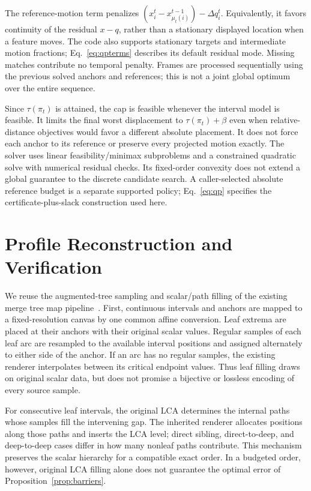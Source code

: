\documentclass[10pt]{article}
\begin{document}
The reference-motion term penalizes
$(x_i^t-x_{\mu_t(i)}^{t-1})-\Delta q_i^t$.
Equivalently, it favors continuity of the residual $x-q$, rather than a stationary displayed location when a feature moves. The code also supports stationary targets and intermediate motion fractions; Eq.~\ref{eq:qpterms} describes its default residual mode. Missing matches contribute no temporal penalty. Frames are processed sequentially using the previous solved anchors and references; this is not a joint global optimum over the entire sequence.

Since $\tau(\pi_t)$ is attained, the cap is feasible whenever the interval model is feasible. It limits the final worst displacement to $\tau(\pi_t)+\beta$ even when relative-distance objectives would favor a different absolute placement. It does not force each anchor to its reference or preserve every projected motion exactly. The solver uses linear feasibility/minimax subproblems and a constrained quadratic solve with numerical residual checks. Its fixed-order convexity does not extend a global guarantee to the discrete candidate search. A caller-selected absolute reference budget is a separate supported policy; Eq.~\ref{eq:qp} specifies the certificate-plus-slack construction used here.

\section{Profile Reconstruction and Verification}\label{sec:rendering}
We reuse the augmented-tree sampling and scalar/path filling of the existing merge tree map pipeline~\cite{Koepp:2023:TMTM,STMTM:2026}. First, continuous intervals and anchors are mapped to a fixed-resolution canvas by one common affine conversion. Leaf extrema are placed at their anchors with their original scalar values. Regular samples of each leaf arc are resampled to the available interval positions and assigned alternately to either side of the anchor. If an arc has no regular samples, the existing renderer interpolates between its critical endpoint values. Thus leaf filling draws on original scalar data, but does not promise a bijective or lossless encoding of every source sample.

For consecutive leaf intervals, the original LCA determines the internal paths whose samples fill the intervening gap. The inherited renderer allocates positions along those paths and inserts the LCA level; direct sibling, direct-to-deep, and deep-to-deep cases differ in how many nonleaf paths contribute. This mechanism preserves the scalar hierarchy for a compatible exact order. In a budgeted order, however, original LCA filling alone does not guarantee the optimal error of Proposition~\ref{prop:barriers}.
\end{document}
